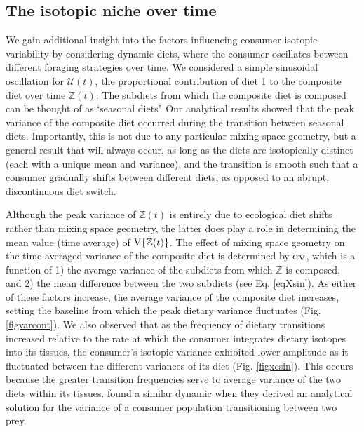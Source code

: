 \documentclass{article}
\begin{document}
\subsection*{The isotopic niche over time}

We gain additional insight into the factors influencing consumer isotopic variability by considering dynamic diets, where the consumer oscillates between different foraging strategies over time.
We considered a simple sinusoidal oscillation for $\mathcal{U}(t)$, the proportional contribution of diet 1 to the composite diet over time $\mathbb{Z}(t)$.
The subdiets from which the composite diet is composed can be thought of as `seasonal diets'.
Our analytical results showed that the peak variance of the composite diet occurred during the transition between seasonal diets.
Importantly, this is not due to any particular mixing space geometry, but a general result that will always occur, as long as the diets are isotopically distinct (each with a unique mean and variance), and the transition is smooth such that a consumer gradually shifts between different diets, as opposed to an abrupt, discontinuous diet switch.

Although the peak variance of $\mathbb{Z}(t)$ is entirely due to ecological diet shifts rather than mixing space geometry, the latter does play a role in determining the mean value (time average) of ${\rm V}\{\mathbb{Z}(t)\}$.
The effect of mixing space geometry on the time-averaged variance of the composite diet is determined by $\alpha_{\rm V}$, which is a function of
1) the average variance of the subdiets from which $\mathbb{Z}$ is composed, and
2) the mean difference between the two subdiets (see Eq. \ref{eqXsin}).
As either of these factors increase, the average variance of the composite diet increases, setting the baseline from which the peak dietary variance fluctuates (Fig. \ref{figvarcont}).
We also observed that as the frequency of dietary transitions increased relative to the rate at which the consumer integrates dietary isotopes into its tissues, the consumer's isotopic variance exhibited lower amplitude as it fluctuated between the different variances of its diet (Fig. \ref{figxcsin}).
This occurs because the greater transition frequencies serve to average variance of the two diets within its tissues.
\citet{Fink:2012eg} found a similar dynamic when they derived an analytical solution for the variance of a consumer population transitioning between two prey.
\end{document}
